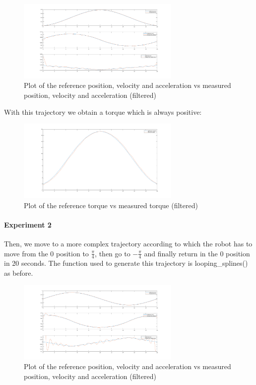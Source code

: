\documentclass{article}
\begin{document}
\begin{figure}[!htbp]
\centering
\includegraphics[width=0.7\textwidth]{images/1-dof/new_experiment1_traj.png}
\caption{Plot of the reference position, velocity and acceleration vs measured position, velocity and acceleration (filtered)}
\end{figure}

\noindent With this trajectory we obtain a torque which is always positive:

\begin{figure}[!htbp]
\centering
\includegraphics[width=0.7\textwidth]{images/1-dof/new_experiment1.png}
\caption{Plot of the reference torque vs measured torque (filtered)}
\end{figure}
\pagebreak
\paragraph{Experiment 2}Then, we move to a more complex trajectory according to which the robot has to move from the 0 position to $\frac{\pi}{4}$, then go to $-\frac{\pi}{4}$ and finally return in the 0 position in 20 seconds. The function used to generate this trajectory is looping\_splines() as before.

\begin{figure}[!htbp]
\centering
\includegraphics[width=0.7\textwidth]{images/1-dof/new_experiment2_traj.png}
\caption{Plot of the reference position, velocity and acceleration vs measured position, velocity and acceleration (filtered)}
\end{figure}
\FloatBarrier
\end{document}

